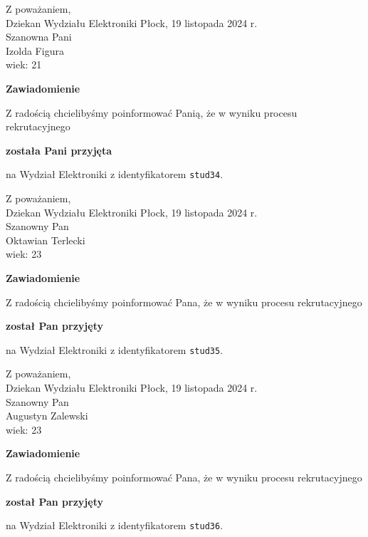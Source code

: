 \documentclass[12pt,a4paper]{article}
\begin{document}
\noindent
Z poważaniem,\\
Dziekan
Wydziału Elektroniki
\newpage
\hfill Płock, 19 listopada 2024 r.\\ 
\noindent 
Szanowna Pani \\
Izolda Figura \\
wiek: 21

\bigskip

\begin{center}
{\Large\textbf{Zawiadomienie}}
\end{center}
\bigskip
Z radością chcielibyśmy poinformować Panią, że w wyniku procesu rekrutacyjnego
\begin{center}
\textsf{\textbf{została Pani przyjęta}} 
\end{center}
na Wydział Elektroniki z identyfikatorem \verb|stud34|.
\vspace{2cm}

\noindent
Z poważaniem,\\
Dziekan
Wydziału Elektroniki
\newpage
\hfill Płock, 19 listopada 2024 r.\\ 
\noindent 
Szanowny Pan \\
Oktawian Terlecki \\
wiek: 23

\bigskip

\begin{center}
{\Large\textbf{Zawiadomienie}}
\end{center}
\bigskip
Z radością chcielibyśmy poinformować Pana, że w wyniku procesu rekrutacyjnego
\begin{center}
\textsf{\textbf{został Pan przyjęty}} 
\end{center}
na Wydział Elektroniki z identyfikatorem \verb|stud35|.
\vspace{2cm}

\noindent
Z poważaniem,\\
Dziekan
Wydziału Elektroniki
\newpage
\hfill Płock, 19 listopada 2024 r.\\ 
\noindent 
Szanowny Pan \\
Augustyn Zalewski \\
wiek: 23

\bigskip

\begin{center}
{\Large\textbf{Zawiadomienie}}
\end{center}
\bigskip
Z radością chcielibyśmy poinformować Pana, że w wyniku procesu rekrutacyjnego
\begin{center}
\textsf{\textbf{został Pan przyjęty}} 
\end{center}
na Wydział Elektroniki z identyfikatorem \verb|stud36|.
\vspace{2cm}
\end{document}
